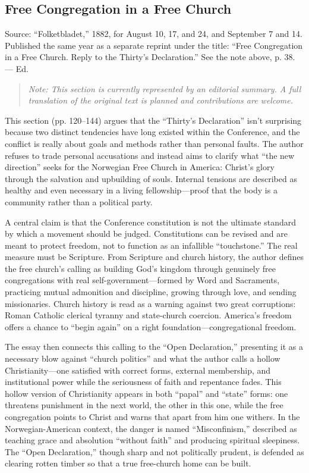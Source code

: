 
\subsection{Free Congregation in a Free Church}

Source: “Folketbladet,” 1882, for August 10, 17, and 24, and September 7 and 14. Published the same year as a separate reprint under the title: “Free Congregation in a Free Church. Reply to the Thirty’s Declaration.” See the note above, p. 38. — Ed.

\begin{quote}
\emph{Note: This section is currently represented by an editorial summary. 
A full translation of the original text is planned and contributions are welcome.}
\end{quote}


This section (pp. 120–144) argues that the “Thirty’s Declaration” isn’t surprising because two distinct tendencies have long existed within the Conference, and the conflict is really about goals and methods rather than personal faults. The author refuses to trade personal accusations and instead aims to clarify what “the new direction” seeks for the Norwegian Free Church in America: Christ’s glory through the salvation and upbuilding of souls. Internal tensions are described as healthy and even necessary in a living fellowship—proof that the body is a community rather than a political party.

A central claim is that the Conference constitution is not the ultimate standard by which a movement should be judged. Constitutions can be revised and are meant to protect freedom, not to function as an infallible “touchstone.” The real measure must be Scripture. From Scripture and church history, the author defines the free church’s calling as building God’s kingdom through genuinely free congregations with real self-government—formed by Word and Sacraments, practicing mutual admonition and discipline, growing through love, and sending missionaries. Church history is read as a warning against two great corruptions: Roman Catholic clerical tyranny and state-church coercion. America’s freedom offers a chance to “begin again” on a right foundation—congregational freedom.

The essay then connects this calling to the “Open Declaration,” presenting it as a necessary blow against “church politics” and what the author calls a hollow Christianity—one satisfied with correct forms, external membership, and institutional power while the seriousness of faith and repentance fades. This hollow version of Christianity appears in both “papal” and “state” forms: one threatens punishment in the next world, the other in this one, while the free congregation points to Christ and warns that apart from him one withers. In the Norwegian-American context, the danger is named “Misconfinism,” described as teaching grace and absolution “without faith” and producing spiritual sleepiness. The “Open Declaration,” though sharp and not politically prudent, is defended as clearing rotten timber so that a true free-church home can be built.

